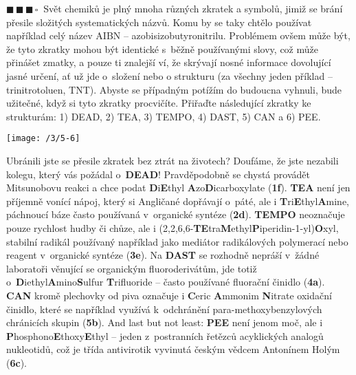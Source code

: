 \documentclass{book}
\newcommand{\tri}{$\blacksquare \, \blacksquare \, \blacksquare \, \square \; \; $}
\renewenvironment{quotation}{\par}{\par} %
\begin{document}
\hrulefill %
\begin{quotation}
\tri Svět chemiků je plný mnoha různých zkratek a symbolů, jimiž se brání
přesile složitých systematických názvů. Komu by se taky 
chtělo používat například celý název AIBN -- azobisizobutyronitrilu. Problémem
ovšem může být, že tyto zkratky mohou být identické s~běžně používanými
slovy, což může přinášet zmatky, a pouze ti znalejší ví, že skrývají
nosné informace dovolující jasné určení, ať už jde o~složení nebo
o strukturu (za všechny jeden příklad -- trinitrotoluen, TNT). Abyste
se případným potížím do budoucna vyhnuli, bude užitečné, když si tyto
zkratky procvičíte. Přiřaďte následující zkratky ke strukturám: 1)
DEAD, 2) TEA, 3) TEMPO, 4) DAST, 5) CAN a 6) PEE. 

\begin{center}
\texttt{[image: /3/5-6]}
\end{center}
\end{quotation} \dotfill \par 
Ubránili jste se přesile zkratek bez ztrát na životech? Doufáme, že
jste nezabili kolegu, který vás požádal o~\textbf{DEAD}! Pravděpodobně
se chystá provádět Mitsunobovu reakci a chce podat \textbf{D}i\textbf{E}thyl \textbf{A}zo\textbf{D}icarboxylate (\textbf{1f}). \textbf{TEA} není jen příjemně
vonící nápoj, který si Angličané dopřávají o~páté, ale i \textbf{T}ri\textbf{E}thyl\textbf{A}mine,
páchnoucí báze často používaná v~organické syntéze (\textbf{2d}). \textbf{TEMPO}
neoznačuje pouze rychlost hudby či chůze, ale i (2,2,6,6-\textbf{TE}tra\textbf{M}ethyl\textbf{P}iperidin-1-yl)\textbf{O}xyl,
stabilní radikál používaný například jako mediátor radikálových polymerací
nebo reagent v~organické syntéze (\textbf{3e}). Na \textbf{DAST} se rozhodně
nepráší v~žádné laboratoři věnující se organickým fluoroderivátům,
jde totiž o~\textbf{D}iethyl\textbf{A}mino\textbf{S}ulfur \textbf{T}rifluoride
-- často používané fluorační činidlo (\textbf{4a}). \textbf{CAN} kromě plechovky
od piva označuje i \textbf{C}eric \textbf{A}mmonim \textbf{N}itrate
oxidační činidlo, které se například využívá k~odchránění para-methoxybenzylových
chránicích skupin (\textbf{5b}). And last but not least: \textbf{PEE} není
jenom moč, ale i \textbf{P}hosphono\textbf{E}thoxy\textbf{E}thyl --
jeden z~postranních řetězců acyklických analogů nukleotidů, což je
třída antivirotik vyvinutá českým vědcem Antonínem Holým (\textbf{6c}).
\end{document}
